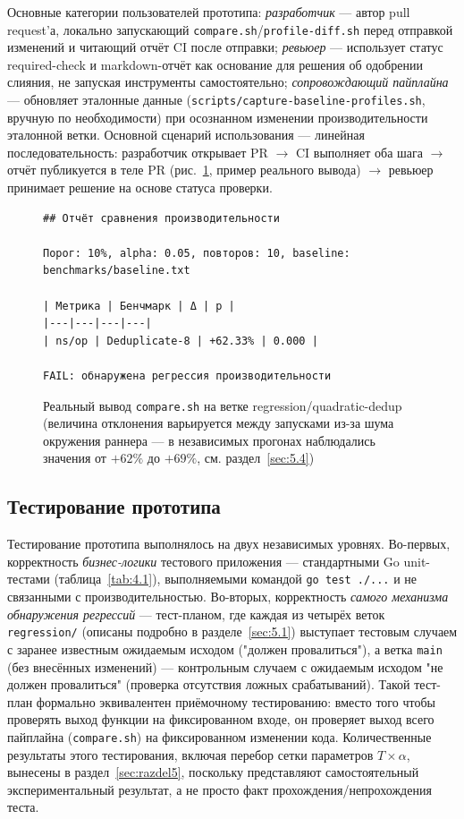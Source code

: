 Основные категории пользователей прототипа: \emph{разработчик} — автор
pull request'а, локально запускающий \texttt{compare.sh}/\texttt{profile-diff.sh}
перед отправкой изменений и читающий отчёт CI после отправки;
\emph{ревьюер} — использует статус required-check и markdown-отчёт как
основание для решения об одобрении слияния, не запуская инструменты
самостоятельно; \emph{сопровождающий пайплайна} — обновляет эталонные
данные (\texttt{scripts/\allowbreak capture-baseline-profiles.sh}, вручную по
необходимости) при осознанном изменении производительности эталонной
ветки. Основной сценарий использования — линейная последовательность:
разработчик открывает PR $\to$ CI выполняет оба шага $\to$ отчёт публикуется
в теле PR (рис.~\ref{fig:4.1}, пример реального вывода) $\to$ ревьюер
принимает решение на основе статуса проверки.

\begin{figure}[htbp]
\centering
\begin{lstlisting}[language={},basicstyle=\ttfamily\fontsize{8.5}{10}\selectfont,frame=single,backgroundcolor=\color{codebg}]
## Отчёт сравнения производительности

Порог: 10%, alpha: 0.05, повторов: 10, baseline: benchmarks/baseline.txt

| Метрика | Бенчмарк | Δ | p |
|---|---|---|---|
| ns/op | Deduplicate-8 | +62.33% | 0.000 |

FAIL: обнаружена регрессия производительности
\end{lstlisting}
\caption{Реальный вывод \texttt{compare.sh} на ветке regression/quadratic-dedup (величина отклонения варьируется между запусками из-за шума окружения раннера --- в независимых прогонах наблюдались значения от $+62\%$ до $+69\%$, см. раздел~\ref{sec:5.4})}
\label{fig:4.1}
\end{figure}

\subsection{Тестирование прототипа}
\label{sec:4.4}

Тестирование прототипа выполнялось на двух независимых уровнях. Во-первых,
корректность \emph{бизнес-логики} тестового приложения — стандартными
Go unit-тестами (таблица~\ref{tab:4.1}), выполняемыми командой \texttt{go
test ./\allowbreak ...} и не связанными с производительностью. Во-вторых, корректность
\emph{самого механизма обнаружения регрессий} — тест-планом, где каждая из
четырёх веток \texttt{regression/\allowbreak *} (описаны подробно в
разделе~\ref{sec:5.1}) выступает тестовым случаем с заранее известным
ожидаемым исходом ("должен провалиться"), а ветка \texttt{main} (без
внесённых изменений) — контрольным случаем с ожидаемым исходом "не должен
провалиться" (проверка отсутствия ложных срабатываний). Такой тест-план
формально эквивалентен приёмочному тестированию: вместо того чтобы
проверять выход функции на фиксированном входе, он проверяет выход всего
пайплайна (\texttt{compare.sh}) на фиксированном изменении кода.
Количественные результаты этого тестирования, включая перебор сетки
параметров $T \times \alpha$, вынесены в раздел~\ref{sec:razdel5}, поскольку
представляют самостоятельный экспериментальный результат, а не просто
факт прохождения/непрохождения теста.

